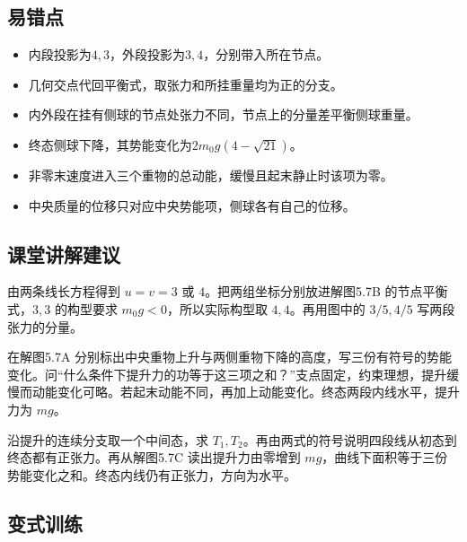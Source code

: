 \documentclass[UTF8,fontset=fandol,a4paper,11pt]{ctexart}
\begin{document}


\subsection*{易错点}

\begin{itemize}
\item 内段投影为$4,3$，外段投影为$3,4$，分别带入所在节点。
\item 几何交点代回平衡式，取张力和所挂重量均为正的分支。
\item 内外段在挂有侧球的节点处张力不同，节点上的分量差平衡侧球重量。
\item 终态侧球下降，其势能变化为$2m_0g(4-\sqrt{21})$。
\item 非零末速度进入三个重物的总动能，缓慢且起末静止时该项为零。
\item 中央质量的位移只对应中央势能项，侧球各有自己的位移。
\end{itemize}



\subsection*{课堂讲解建议}

由两条线长方程得到 $u=v=3$ 或 $4$。把两组坐标分别放进解图5.7B 的节点平衡式，$3,3$ 的构型要求 $m_0g<0$，所以实际构型取 $4,4$。再用图中的 $3/5,4/5$ 写两段张力的分量。

在解图5.7A 分别标出中央重物上升与两侧重物下降的高度，写三份有符号的势能变化。问“什么条件下提升力的功等于这三项之和？”支点固定，约束理想，提升缓慢而动能变化可略。若起末动能不同，再加上动能变化。终态两段内线水平，提升力为 $mg$。

沿提升的连续分支取一个中间态，求 $T_1,T_2$。再由两式的符号说明四段线从初态到终态都有正张力。再从解图5.7C 读出提升力由零增到 $mg$，曲线下面积等于三份势能变化之和。终态内线仍有正张力，方向为水平。



\subsection*{变式训练}
\end{document}
